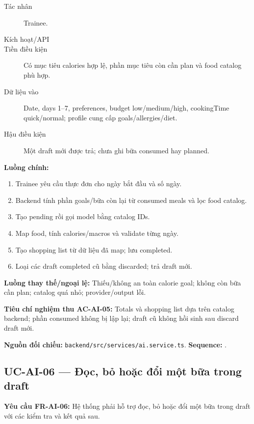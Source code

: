 \documentclass[12pt,a4paper]{article}
\newcommand{\evidence}[1]{{\small\nolinkurl{#1}}}
\begin{document}
\begin{description}
\item[Tác nhân] Trainee.
\item[Kích hoạt/API] 
\item[Tiền điều kiện] Có mục tiêu calories hợp lệ, phần mục tiêu còn cần plan và food catalog phù hợp.
\item[Dữ liệu vào] Date, days 1–7, preferences, budget low/medium/high, cookingTime quick/normal; profile cung cấp goals/allergies/diet.
\item[Hậu điều kiện] Một draft mới được trả; chưa ghi bữa consumed hay planned.
\end{description}
\textbf{Luồng chính:}
\begin{enumerate}
  \item Trainee yêu cầu thực đơn cho ngày bắt đầu và số ngày.
  \item Backend tính phần goals/bữa còn lại từ consumed meals và lọc food catalog.
  \item Tạo pending rồi gọi model bằng catalog IDs.
  \item Map food, tính calories/macros và validate từng ngày.
  \item Tạo shopping list từ dữ liệu đã map; lưu completed.
  \item Loại các draft completed cũ bằng discarded; trả draft mới.
\end{enumerate}
\textbf{Luồng thay thế/ngoại lệ:} Thiếu/không an toàn calorie goal; không còn bữa cần plan; catalog quá nhỏ; provider/output lỗi.

\textbf{Tiêu chí nghiệm thu AC-AI-05:} Totals và shopping list dựa trên catalog backend; phần consumed không bị lập lại; draft cũ không hồi sinh sau discard draft mới.

\textbf{Nguồn đối chiếu:} \evidence{backend/src/services/ai.service.ts}. \textbf{Sequence:} .

\subsection{UC-AI-06 --- Đọc, bỏ hoặc đổi một bữa trong draft}
\label{uc-ai-6}
\textbf{Yêu cầu FR-AI-06:} Hệ thống phải hỗ trợ đọc, bỏ hoặc đổi một bữa trong draft với các kiểm tra và kết quả sau.
\end{document}
